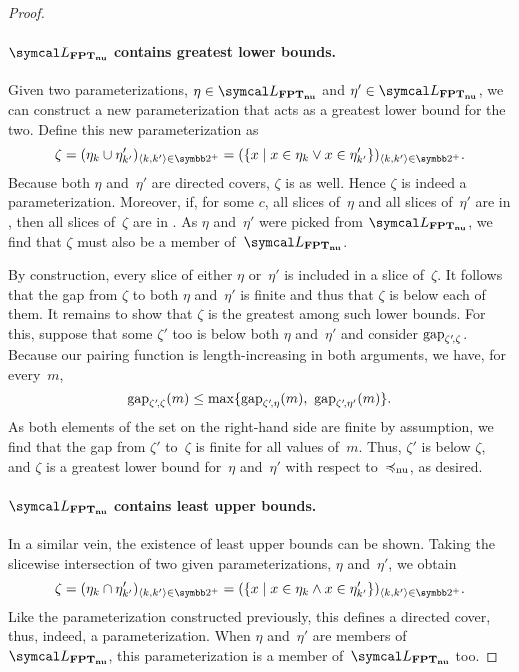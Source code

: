 \begin{proof}
  \paragraph{$\calL_\clnu{FPT}$ contains greatest lower bounds.}
  Given two parameterizations, $\eta \in \calL_\clnu{FPT}$ and $\eta' \in \calL_\clnu{FPT}$, we can construct a new parameterization that acts as a greatest lower bound for the two.
  Define this new parameterization as
  \begin{equation*}
    \zeta \deq (\eta_k \cup \eta'_{k'})_{\pair{k}{k'} \in \binary^+} = (\{x \st x \in \eta_k \lor x \in \eta'_{k'}\})_{\pair{k}{k'} \in \binary^+}.
  \end{equation*}
  Because both $\eta$ and~$\eta'$ are directed covers, $\zeta$ is as well.
  Hence $\zeta$ is indeed a parameterization.
  Moreover, if, for some $c$, all slices of~$\eta$ and all slices of~$\eta'$ are in , then all slices of~$\zeta$ are in .
  As $\eta$ and~$\eta'$ were picked from $\calL_\clnu{FPT}$, we find that $\zeta$ must also be a member of~$\calL_\clnu{FPT}$.

  By construction, every slice of either $\eta$ or~$\eta'$ is included in a slice of~$\zeta$.
  It follows that the gap from $\zeta$ to both $\eta$ and~$\eta'$ is finite and thus that $\zeta$ is below each of them.
  It remains to show that $\zeta$ is the greatest among such lower bounds.
  For this, suppose that some $\zeta'$ too is below both $\eta$ and~$\eta'$ and consider $\operatorname{gap}_{\zeta'\!, \zeta}$.
  Because our pairing function is length-increasing in both arguments, we have, for every~$m$,
  \begin{equation*}
    \operatorname{gap}_{\zeta'\!, \zeta}(m) \le \max\{\operatorname{gap}_{\zeta'\!, \eta}(m),\ \operatorname{gap}_{\zeta'\!, \eta'}(m)\}.
  \end{equation*}
  As both elements of the set on the right-hand side are finite by assumption, we find that the gap from $\zeta'$ to~$\zeta$ is finite for all values of~$m$.
  Thus, $\zeta'$ is below $\zeta$, and $\zeta$ is a greatest lower bound for~$\eta$ and~$\eta'$ with respect to~$\preccurlyeq_\mathrm{nu}$, as desired.

  \paragraph{$\calL_\clnu{FPT}$ contains least upper bounds.}
  In a similar vein, the existence of least upper bounds can be shown.
  Taking the slicewise intersection of two given parameterizations, $\eta$ and~$\eta'$, we obtain
  \begin{equation*}
    \zeta \deq (\eta_k \cap \eta'_{k'})_{\pair{k}{k'} \in \binary^+} = (\{x \st x \in \eta_k \land x \in \eta'_{k'}\})_{\pair{k}{k'} \in \binary^+}.
  \end{equation*}
  Like the parameterization constructed previously, this defines a directed cover, thus, indeed, a parameterization.
  When $\eta$ and~$\eta'$ are members of~$\calL_\clnu{FPT}$, this parameterization is a member of~$\calL_\clnu{FPT}$ too.


\end{proof}
